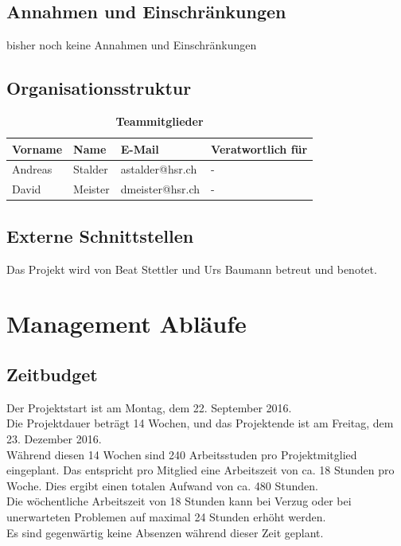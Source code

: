 \documentclass[a4,12pt]{scrartcl}
\begin{document}
\subsection{Annahmen und Einschränkungen}
bisher noch keine Annahmen und Einschränkungen
\subsection{Organisationsstruktur}
\begin{table}[H]
\centering
    \begin{tabular}{@{} l l l l@{}}    
    {Vorname} & {Name} & {E-Mail} & Veratwortlich für\\ \midrule
    Andreas & Stalder & astalder@hsr.ch & -\\ \addlinespace
    David & Meister & dmeister@hsr.ch & -\\ \bottomrule
    \end{tabular}
\caption{\textbf{Teammitglieder}}
\end{table} 

\subsection{Externe Schnittstellen}
Das Projekt wird von Beat Stettler und Urs Baumann betreut und benotet.

\section{Management Abläufe}
\subsection{Zeitbudget}
Der Projektstart ist am Montag, dem 22. September 2016. \\
Die Projektdauer beträgt 14 Wochen, und das Projektende ist am Freitag, dem 23. Dezember 2016. \\

\noindent Während diesen 14 Wochen sind 240 Arbeitsstuden pro Projektmitglied eingeplant. Das entspricht pro Mitglied eine Arbeitszeit von ca. 18 Stunden pro Woche. Dies ergibt einen totalen Aufwand von ca. 480 Stunden.\\

\noindent Die wöchentliche Arbeitszeit von 18 Stunden kann bei Verzug oder bei unerwarteten Problemen auf maximal 24 Stunden erhöht werden. \\

\noindent Es sind gegenwärtig keine Absenzen während dieser Zeit geplant. 
\end{document}
